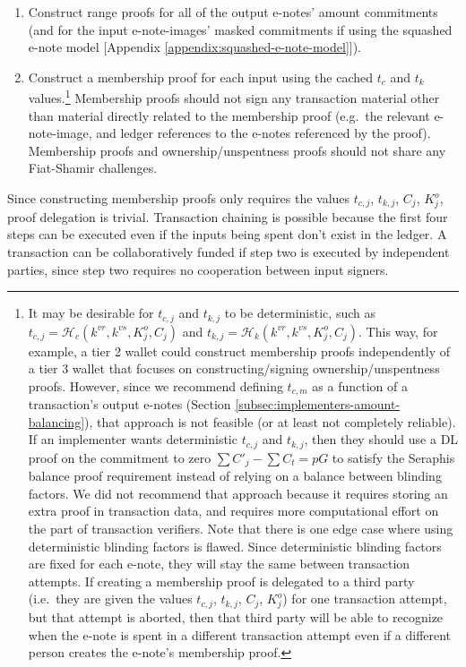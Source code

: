 \begin{enumerate}
    \item Construct range proofs for all of the output e-notes' amount commitments (and for the input e-note-images' masked commitments if using the squashed e-note model [Appendix \ref{appendix:squashed-e-note-model}]).

    \item Construct a membership proof for each input using the cached $t_c$ and $t_k$ values.\footnote{It may be desirable for $t_{c,j}$ and $t_{k,j}$ to be deterministic, such as $t_{c,j} = \mathcal{H}_c(k^{vr}, k^{vs}, K^o_j, C_j)$ and $t_{k,j} = \mathcal{H}_k(k^{vr}, k^{vs}, K^o_j, C_j)$. This way, for example, a tier 2 wallet could construct membership proofs independently of a tier 3 wallet that focuses on constructing/signing ownership/unspentness proofs. However, since we recommend defining $t_{c,m}$ as a function of a transaction's output e-notes (Section \ref{subsec:implementers-amount-balancing}), that approach is not feasible (or at least not completely reliable). If an implementer wants deterministic $t_{c,j}$ and $t_{k,j}$, then they should use a DL proof on the commitment to zero $\sum C'_j - \sum C_t = p G$ to satisfy the Seraphis balance proof requirement instead of relying on a balance between blinding factors. We did not recommend that approach because it requires storing an extra proof in transaction data, and requires more computational effort on the part of transaction verifiers. Note that there is one edge case where using deterministic blinding factors is flawed. Since deterministic blinding factors are fixed for each e-note, they will stay the same between transaction attempts. If creating a membership proof is delegated to a third party (i.e.\ they are given the values $t_{c,j}$, $t_{k,j}$, $C_j$, $K^o_j$) for one transaction attempt, but that attempt is aborted, then that third party will be able to recognize when the e-note is spent in a different transaction attempt even if a different person creates the e-note's membership proof.} Membership proofs should not sign any transaction material other than material directly related to the membership proof (e.g.\ the relevant e-note-image, and ledger references to the e-notes referenced by the proof). Membership proofs and ownership/unspentness proofs should not share any Fiat-Shamir challenges.
\end{enumerate}

Since constructing membership proofs only requires the values $t_{c,j}$, $t_{k,j}$, $C_j$, $K^o_j$, proof delegation is trivial. Transaction chaining is possible because the first four steps can be executed even if the inputs being spent don't exist in the ledger. A transaction can be collaboratively funded if step two is executed by independent parties, since step two requires no cooperation between input signers.


